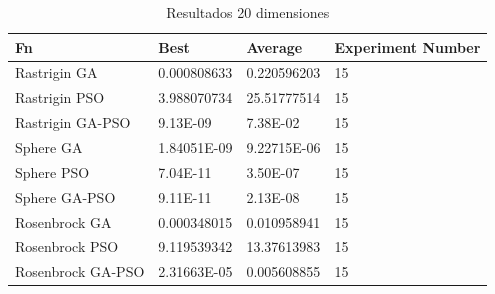 \documentclass[runningheads]{llncs}
\begin{document}
                  \begin{table}[htp]

    \caption{Resultados 20 dimensiones}
    \label{table:resultados-2}
    \centering
    \begin{tabular}{|l|l|l|l|}
    \hline
    Fn & Best & Average & Experiment Number \\
    \hline
    \hline
    Rastrigin GA & 0.000808633 & 0.220596203 & 15\\
    \hline
    Rastrigin PSO & 3.988070734 & 25.51777514 & 15\\
    \hline
    Rastrigin GA-PSO & 9.13E-09 & 7.38E-02 & 15\\
    \hline
    Sphere GA & 1.84051E-09 & 9.22715E-06 & 15\\
    \hline
    Sphere PSO & 7.04E-11 & 3.50E-07 & 15\\
    \hline
    Sphere GA-PSO & 9.11E-11 & 2.13E-08 & 15\\
    \hline
    Rosenbrock GA & 0.000348015 & 0.010958941 & 15\\
    \hline
    Rosenbrock PSO & 9.119539342 & 13.37613983 & 15\\
    \hline
    Rosenbrock GA-PSO & 2.31663E-05 & 0.005608855 & 15\\
    \hline
    \end{tabular}
    \end{table}
    


\end{document}
